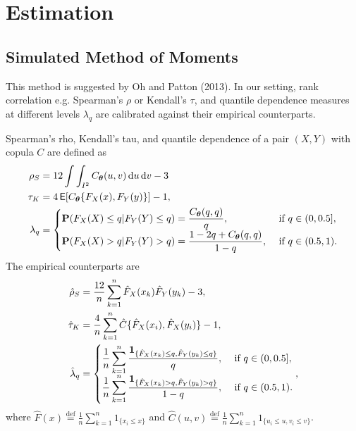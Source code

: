
\section{Estimation}\label{sec:estimation}

\subsection{Simulated Method of Moments}\label{subsec:simulated-method-of-moments}
This method is suggested by Oh and Patton (2013).
In our setting, rank correlation e.g. Spearman's $\rho$ or Kendall's $\tau$,
and quantile dependence measures at different levels $\lambda_q$
are calibrated against their empirical counterparts.\medskip

Spearman's rho, Kendall's tau, and quantile dependence of a pair $(X,Y)$
with copula $C$ are defined as
\begin{align}
  \rho_S &= 12 \int\int_{I^2} C_{\bm{\theta}}(u,v)\, {\rm d} u\, {\rm d} v-3\label{eq:rho_S}\\
  \tau_K &= 4\operatorname{\mathsf{E}}[C_{\bm{\theta}}\{F_X(x), F_Y(y)\}]-1,\\
  \lambda_q &=
  \begin{cases}
    {\bf P}(F_X(X)\leq q| F_Y(Y)\leq q) = \displaystyle \frac{C_{\bm{\theta}}(q,q)}{q},
    &\text{ if } q\in (0,0.5],\\
    {\bf P}(F_X(X)>q|F_Y(Y)>q) =\displaystyle \frac{1-2q+C_{\bm{\theta}}(q,q)} {1-q},
    &\text{ if } q\in (0.5,1).
  \end{cases}
\end{align}\medskip
The empirical counterparts are
\begin{align*}
  \hat\rho_S &= \frac{12}{n} \sum_{k=1}^n \hat F_X(x_k) \hat F_Y(y_k)
               -3,\\
  \hat\tau_K &= \frac{4}{n}\sum_{k=1}^n \hat{C}\{\hat{F}_X(x_i),\hat{F}_X(y_i)\} -1 ,\\
  \hat\lambda_q &=
                  \begin{cases}
                    \displaystyle\frac{1}{n} \sum_{k=1}^n \frac{\textbf{1}_{\{\hat
                        F_X(x_k)\leq q, \hat F_Y(y_k)\leq q\}}} {q},
                    &\text { if } q\in (0, 0.5],\\
                    \displaystyle \frac{1}{n} \sum_{k=1}^n
                    \frac{\textbf{1}_{\{\hat F_X(x_k)>q, \hat F_Y(y_k)>q\}}}
                    {1-q}, &\text { if } q\in (0.5,1).
                  \end{cases},
\end{align*}
where $\hat{F}(x) \overset{\mathrm{def}}{=} \frac{1}{n}\sum_{k=1}^n 1_{\{x_i\leq x\}}$ and
$\hat{C}(u,v) \overset{\mathrm{def}}{=}  \frac{1}{n}\sum_{k=1}^n 1_{\{u_i\leq u, v_i\leq v\}}$.\medskip

